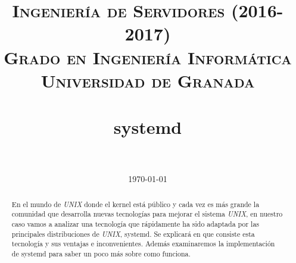


\title{	
\normalfont \normalsize 
\textsc{\textbf{Ingeniería de Servidores (2016-2017)} \\ Grado en Ingeniería Informática \\ Universidad de Granada} \\ [25pt] %
\horrule{0.5pt} \\[0.4cm] %
\huge systemd \\ %
\horrule{2pt} \\[0.5cm] %
}

\date{\normalsize\today} %




\maketitle %

\newpage

\begin{abstract}

En el mundo de \textit{UNIX} donde el kernel está público y 
cada vez es más grande la comunidad que desarrolla nuevas tecnologías 
para mejorar el sistema \textit{UNIX}, en nuestro caso vamos a analizar
una tecnología que rápidamente ha sido adaptada por las principales 
distribuciones de \textit{UNIX}, systemd. Se explicará en que consiste esta 
tecnología y sus ventajas e inconvenientes. Además examinaremos la
 implementación de systemd para saber un poco más sobre como funciona.

\end{abstract}


